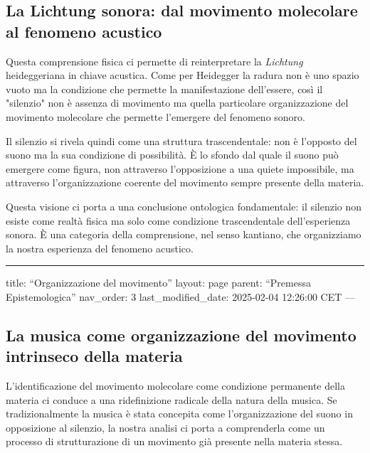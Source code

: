 \documentclass[a4paper,11pt]{article}
\begin{document}
\subsection{La Lichtung sonora: dal movimento molecolare al fenomeno acustico}\hypertarget{la-lichtung-sonora-dal-movimento-molecolare-al-fenomeno-acustico}{}\label{la-lichtung-sonora-dal-movimento-molecolare-al-fenomeno-acustico}

Questa comprensione fisica ci permette di reinterpretare la \emph{Lichtung}
heideggeriana in chiave acustica. Come per Heidegger la radura non è uno
spazio vuoto ma la condizione che permette la manifestazione
dell'essere, così il "silenzio" non è assenza di movimento ma quella
particolare organizzazione del movimento molecolare che permette
l'emergere del fenomeno sonoro.

Il silenzio si rivela quindi come una struttura trascendentale: non è
l'opposto del suono ma la sua condizione di possibilità. È lo sfondo dal
quale il suono può emergere come figura, non attraverso l'opposizione a
una quiete impossibile, ma attraverso l'organizzazione coerente del
movimento sempre presente della materia.

Questa visione ci porta a una conclusione ontologica fondamentale: il
silenzio non esiste come realtà fisica ma solo come condizione
trascendentale dell'esperienza sonora. È una categoria della
comprensione, nel senso kantiano, che organizziamo la nostra esperienza
del fenomeno acustico.



\begin{center}
\rule{3in}{0.4pt}
\end{center}
title: ``Organizzazione del movimento''
layout: page
parent: ``Premessa Epistemologica''
nav\_order: 3
last\_modified\_date: 2025-02-04 12:26:00 CET
---

\subsection{La musica come organizzazione del movimento intrinseco della materia}\hypertarget{la-musica-come-organizzazione-del-movimento-intrinseco-della-materia}{}\label{la-musica-come-organizzazione-del-movimento-intrinseco-della-materia}

L'identificazione del movimento molecolare come condizione permanente
della materia ci conduce a una ridefinizione radicale della natura della
musica. Se tradizionalmente la musica è stata concepita come
l'organizzazione del suono in opposizione al silenzio, la nostra analisi
ci porta a comprenderla come un processo di strutturazione di un
movimento già presente nella materia stessa.
\end{document}
